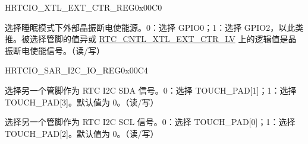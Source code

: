 \begin{register}{H}{RTCIO\_XTL\_EXT\_CTR\_REG}{0x00C0}\label{regdesc:RTCIOXTLEXTCTRREG}
%
%
\regnewline%
\begin{regdesc}\begin{reglist}
\item [RTCIO\_XTL\_EXT\_CTR\_SEL]选择睡眠模式下外部晶振断电使能源。0：选择 GPIO0；1：选择 GPIO2，以此类推。被选择管脚的值异或 \hyperref[regdesc:RTCCNTLXTEXTCTRLV]{RTC\_CNTL\_XTL\_EXT\_CTR\_LV} 上的逻辑值是晶振断电使能信号。（读/写）
\end{reglist}\end{regdesc}
\end{register}


\begin{register}{H}{RTCIO\_SAR\_I2C\_IO\_REG}{0x00C4}\label{regdesc:RTCIOSARI2CIOREG}
%
%
%
\regnewline%
\begin{regdesc}\begin{reglist}
\item [RTCIO\_SAR\_I2C\_SDA\_SEL]选择另一个管脚作为 RTC I2C SDA 信号。0：选择 TOUCH\_PAD[1]；1：选择 TOUCH\_PAD[3]。默认值为 0。（读/写）
\item [RTCIO\_SAR\_I2C\_SCL\_SEL]选择另一个管脚作为 RTC I2C SCL 信号。0：选择 TOUCH\_PAD[0]；1：选择 TOUCH\_PAD[2]。默认值为 0。（读/写）
\end{reglist}\end{regdesc}
\end{register}
